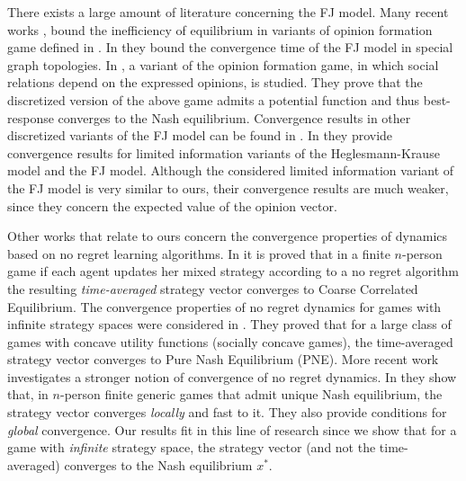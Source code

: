 There exists a large amount of literature concerning the FJ model.  Many recent
works \cite{BGM13,CKO13}, \cite{BFM16,EFHS17} bound the inefficiency of
equilibrium in variants of opinion formation game defined in \cite{BKO11}. In
\cite{GS14} they bound the convergence time of the FJ model in special graph
topologies.  In \cite{BFM16}, a variant of the opinion formation game, in which
social relations depend on the expressed opinions, is studied.  They prove that
the discretized version of the above game admits a potential function and thus
best-response converges to the Nash equilibrium.  Convergence results in other
discretized variants of the FJ model can be found in \cite{YOASS13,FGV16}. In
\cite{FPS16} they provide convergence results for limited information variants
of the Heglesmann-Krause model \cite{HK} and the FJ model. Although the
considered limited information variant of the FJ model is very similar to ours,
their convergence results are much weaker, since they concern the expected
value of the opinion vector.

Other works that relate to ours concern the convergence properties of dynamics
based on no regret learning algorithms.  In \cite{FV97,FS99,SA00,SALS15} it is
proved that in a finite $n$-person game if each agent updates her mixed
strategy according to a no regret algorithm the resulting \emph{time-averaged}
strategy vector converges to Coarse Correlated Equilibrium. The convergence
properties of no regret dynamics for games with infinite strategy spaces were
considered in \cite{EMN09}.  They proved that for a large class of games with
concave utility functions (socially concave games), the time-averaged strategy
vector converges to Pure Nash Equilibrium (PNE). More recent work investigates
a stronger notion of convergence of no regret dynamics. In \cite{CHM17} they
show that, in $n$-person finite generic games that admit unique Nash
equilibrium, the strategy vector converges \emph{locally} and fast to it.  They
also provide conditions for \emph{global} convergence.  Our results fit in this
line of research since we show that for a game with \emph{infinite} strategy
space, the strategy vector (and not the time-averaged) converges to the Nash
equilibrium $x^*$.

